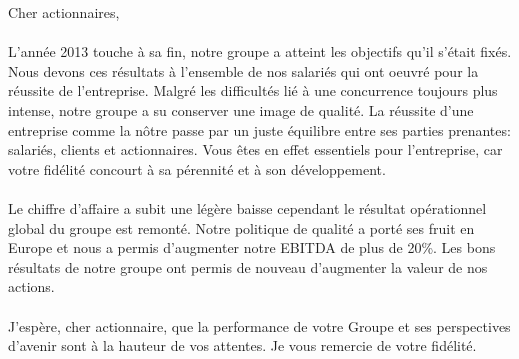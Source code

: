 Cher actionnaires,\\

\begin{minipage}[t]{0.45\textwidth}
\paragraph{} L'année 2013 touche à sa fin, notre groupe a atteint les objectifs qu'il s'était fixés.
	 Nous devons ces résultats à l'ensemble de nos salariés qui ont oeuvré pour la réussite de l'entreprise.
	 Malgré les difficultés lié à une concurrence toujours plus intense, notre groupe a su conserver une image de qualité.
	 La réussite d'une entreprise comme la nôtre passe par un juste équilibre entre ses parties prenantes: salariés, clients et actionnaires.
	 Vous êtes en effet essentiels pour l’entreprise, car votre fidélité concourt à sa pérennité et à son développement. 

\end{minipage}
\hfill
\hspace*{0.1\textwidth}
\begin{minipage}[t]{0.45\textwidth}
\paragraph{} Le chiffre d'affaire a subit une légère baisse cependant le résultat opérationnel global du groupe est remonté.
	 Notre politique de qualité a porté ses fruit en Europe et nous a permis d'augmenter notre EBITDA de plus de 20\%.
	 Les bons résultats de notre groupe ont permis de nouveau d'augmenter la valeur de nos actions.\\

\paragraph{} J’espère, cher actionnaire, que la performance de votre Groupe et ses perspectives d’avenir sont à la hauteur de vos attentes.
	 Je vous remercie de votre fidélité.
\end{minipage}



